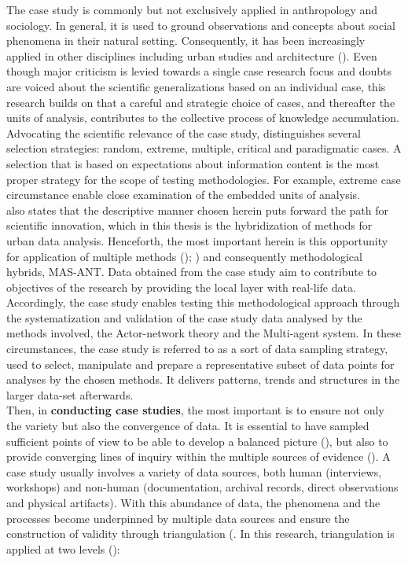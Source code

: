\documentclass[11pt]{report}
\begin{document}
The case study is commonly but not exclusively applied in anthropology and sociology.
In general, it is used to ground observations and concepts about social phenomena in their natural setting. Consequently, it has been increasingly applied in other disciplines including urban studies and architecture (\href{Feagin}{\citealt{feagin_case_1991}}). Even though major criticism is levied towards a single case research focus and doubts are voiced about the scientific generalizations based on an individual case, this research builds on \href{Flyvbjerg}{\citealt{flyvbjerg_five_2006}} that a careful and strategic choice of cases, and thereafter the units of analysis, contributes to the collective process of knowledge accumulation.
Advocating the scientific relevance of the case study, \href{Flvybjerg}{\cite{flyvbjerg_five_2006}} distinguishes several selection strategies: random, extreme, multiple, critical and paradigmatic cases. A selection that is based on expectations about information content is the most proper strategy for the scope of testing methodologies. For example, extreme case circumstance enable close examination of the embedded units of analysis.
\\

\href{Flvybjerg}{\cite{flyvbjerg_five_2006}} also states that the descriptive manner chosen herein puts forward the path for scientific innovation, which in this thesis is the hybridization of methods for urban data analysis. Henceforth, the most important herein is this opportunity for application of multiple methods (\href{Yin}{\citealt{yin_case_2003}}); \href{Yin} {\citealt{yin_case_2009}}) and consequently methodological hybrids, MAS-ANT.
Data obtained from the case study aim to contribute to objectives of the research by providing the local layer with real-life data. Accordingly, the case study enables testing this methodological approach through the systematization and validation of the case study data analysed by the methods involved, the Actor-network theory and the Multi-agent system. In these circumstances, the case study is referred to as a sort of data sampling strategy, used to select, manipulate and prepare a representative subset of data points for analyses by the chosen methods. It delivers patterns, trends and structures in the larger data-set afterwards.
\\

Then, in \textbf{conducting case studies}, the most important is to ensure not only the variety but also the convergence of data. It is essential to have sampled  sufficient  points  of  view  to be able to develop a balanced picture (\href{Harrison}{\citealt{partington_case_2002}}), but also to provide converging lines of inquiry within the multiple sources of evidence (\href{Yin} {\citealt{yin_case_2009}}).
A case study usually involves a variety of data sources, both human (interviews, workshops) and non-human (documentation, archival records, direct observations and physical artifacts).
With this abundance of data, the phenomena and the processes become underpinned by multiple data sources and ensure the construction of validity through triangulation (\href{Denzin}{\citealt{denzin_research_2009}}. In this research, triangulation is applied at two levels (\href{Patton}{\citealt{patton_qualitative_2001}}):
\end{document}
